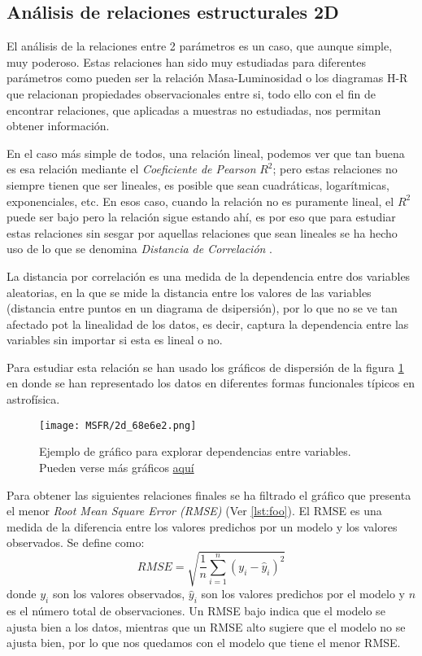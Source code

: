 \documentclass[11pt, a4paper]{article} %
\begin{document}
\subsection{Análisis de relaciones estructurales 2D}

El análisis de la relaciones entre 2 parámetros es un caso, que aunque simple, muy poderoso. Estas relaciones han sido muy estudiadas para diferentes parámetros 
como pueden ser la relación Masa-Luminosidad o los diagramas H-R que relacionan propiedades observacionales entre si, todo ello con el fin de encontrar relaciones, que aplicadas a muestras no estudiadas, nos permitan obtener información. 

En el caso más simple de todos, una relación lineal, podemos ver que tan buena es esa relación mediante el \textit{ Coeficiente de Pearson} $R^2$; pero 
estas relaciones no siempre tienen que ser lineales, es posible que sean cuadráticas, logarítmicas, exponenciales, etc. En esos caso, cuando la relación no es puramente lineal, el $R^2$ puede ser bajo
pero la relación sigue estando ahí, es por eso que para estudiar estas relaciones sin sesgar por aquellas relaciones que sean lineales se ha hecho uso de lo que se denomina \textit{Distancia de Correlación} \autocite{dcor}.

La distancia por correlación es una medida de la dependencia entre dos variables aleatorias, en la que se mide la distancia entre los valores de las variables (distancia entre puntos en un diagrama de dsipersión), por lo que no se ve tan afectado pot la 
linealidad de los datos, es decir, captura la dependencia entre las variables sin importar si esta es lineal o no.

Para estudiar esta relación se han usado los gráficos de dispersión de la figura \ref{fig:MSFR} en donde se han representado los datos en diferentes formas funcionales típicos en astrofísica.

\begin{figure}[H]
    \centering
    \texttt{[image: MSFR/2d\_68e6e2.png]}
    \caption{Ejemplo de gráfico para explorar dependencias entre variables. Pueden verse más gráficos \href{https://github.com/PhyAMR/TFG/tree/main/MSFR}{aquí}}
    \label{fig:MSFR}
\end{figure}

Para obtener las siguientes relaciones finales se ha filtrado el gráfico que presenta el menor \textit{Root Mean Square Error (RMSE)} (Ver \ref{lst:foo}). El RMSE es una medida de la diferencia entre los valores predichos por un modelo y los valores observados. Se define como:
\begin{equation}
    RMSE = \sqrt{\frac{1}{n}\sum_{i=1}^{n}(y_i - \hat{y}_i)^2}
\end{equation}
donde $y_i$ son los valores observados, $\hat{y}_i$ son los valores predichos por el modelo y $n$ es el número total de observaciones. Un RMSE bajo indica que el modelo se ajusta bien a los datos, mientras que un RMSE alto sugiere que el modelo no se ajusta bien, por lo que nos quedamos con el modelo que tiene el menor RMSE.
\end{document}
